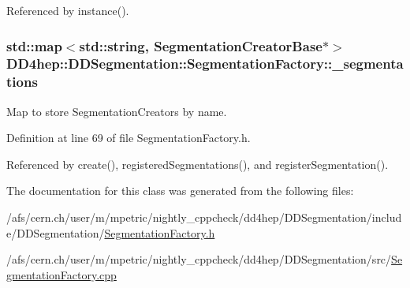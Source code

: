 Referenced by instance().\hypertarget{class_d_d4hep_1_1_d_d_segmentation_1_1_segmentation_factory_a11fdb394993e5ecbd8dcd67ce89a4552}{
\subsubsection[{\_\-segmentations}]{\setlength{\rightskip}{0pt plus 5cm}std::map$<$std::string, {\bf SegmentationCreatorBase}$\ast$$>$ {\bf DD4hep::DDSegmentation::SegmentationFactory::\_\-segmentations}}}
\label{class_d_d4hep_1_1_d_d_segmentation_1_1_segmentation_factory_a11fdb394993e5ecbd8dcd67ce89a4552}


Map to store SegmentationCreators by name. 

Definition at line 69 of file SegmentationFactory.h.

Referenced by create(), registeredSegmentations(), and registerSegmentation().

The documentation for this class was generated from the following files:\begin{DoxyCompactItemize}
\item 
/afs/cern.ch/user/m/mpetric/nightly\_\-cppcheck/dd4hep/DDSegmentation/include/DDSegmentation/\hyperlink{_segmentation_factory_8h}{SegmentationFactory.h}\item 
/afs/cern.ch/user/m/mpetric/nightly\_\-cppcheck/dd4hep/DDSegmentation/src/\hyperlink{_segmentation_factory_8cpp}{SegmentationFactory.cpp}\end{DoxyCompactItemize}
